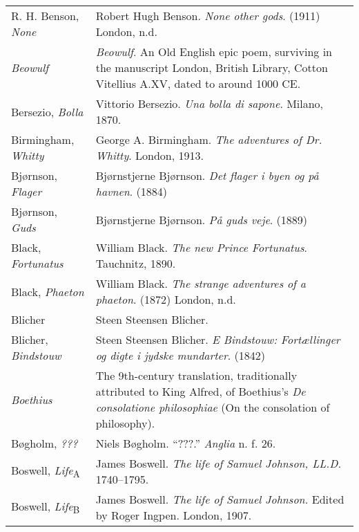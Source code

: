 \begin{longtable}{p{} p{}}
R. H. Benson, \textit{None} & Robert Hugh Benson. \textit{None other gods}. (1911) London, n.d. \\

\textit{Beowulf} & \textit{Beowulf}. An Old English epic poem, surviving in the manuscript London, British Library, Cotton Vitellius A.XV, dated to around 1000 CE. \\

Bersezio, \textit{Bolla} & Vittorio Bersezio. \textit{Una bolla di sapone}. Milano, 1870. \\

Birmingham, \textit{Whitty} & George A. Birmingham. \textit{The adventures of Dr. Whitty}. London, 1913.\\ %

Bjørnson, \textit{Flager} & Bjørnstjerne Bjørnson. \textit{Det flager i byen og på havnen}. (1884)\\
Bjørnson, \textit{Guds} & Bjørnstjerne Bjørnson. \textit{På guds veje}. (1889) \\

Black, \textit{Fortunatus} & William Black. \textit{The new Prince Fortunatus}. Tauchnitz, 1890. \\
Black, \textit{Phaeton} & William Black. \textit{The strange adventures of a phaeton}. (1872) London, n.d. \\

Blicher & Steen Steensen Blicher. \\ %
Blicher, \textit{Bindstouw} & Steen Steensen Blicher. \textit{E Bindstouw: Fortællinger og digte i jydske mundarter}. (1842) \\

\textit{Boethius} & The 9th-century translation, traditionally attributed to King Alfred, of Boethius's \textit{De consolatione philosophiae} (On the consolation of philosophy). \\

Bøgholm, \textit{???} & Niels Bøgholm. ``???.'' \textit{Anglia} n. f. 26. \\ %

Boswell, \textit{Life}\textsubscript{A} & James Boswell. \textit{The life of Samuel Johnson, LL.D.} 1740--1795.\\
Boswell, \textit{Life}\textsubscript{B} & James Boswell. \textit{The life of Samuel Johnson.} Edited by Roger Ingpen. London, 1907.\\ %


\end{longtable}

